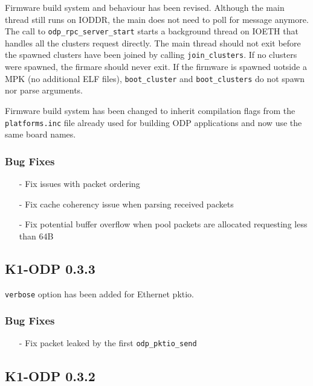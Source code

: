 \documentclass{trkalray}
\begin{document}
Firmware build system and behaviour has been revised.
Although the main thread still runs on IODDR, the main does not need
to poll for message anymore.
The call to \texttt{odp\_rpc\_server\_start} starts a background
thread on IOETH that handles all the clusters request directly.
The main thread should not exit before the spawned clusters have been
joined by calling \texttt{join\_clusters}.
If no clusters were spawned, the firmare should never exit.
If the firmware is spawned uotside a MPK (no additional ELF files),
\texttt{boot\_cluster} and \texttt{boot\_clusters} do not spawn nor
parse arguments.

Firmware build system has been changed to inherit compilation flags
from the \texttt{platforms.inc} file already used for building ODP
applications and now use the same board names.

\subsubsection{Bug Fixes}
\begin{itemize}
\item[-]{Fix issues with packet ordering}
\item[-]{Fix cache coherency issue when parsing received packets}
\item[-]{Fix potential buffer overflow when pool packets are allocated
requesting less than 64B}
\end{itemize}

\subsection{K1-ODP 0.3.3}

\texttt{verbose} option has been added for Ethernet pktio.

\subsubsection{Bug Fixes}
\begin{itemize}
\item[-]{Fix packet leaked by the first \texttt{odp\_pktio\_send}}
\end{itemize}

\subsection{K1-ODP 0.3.2}
\end{document}
